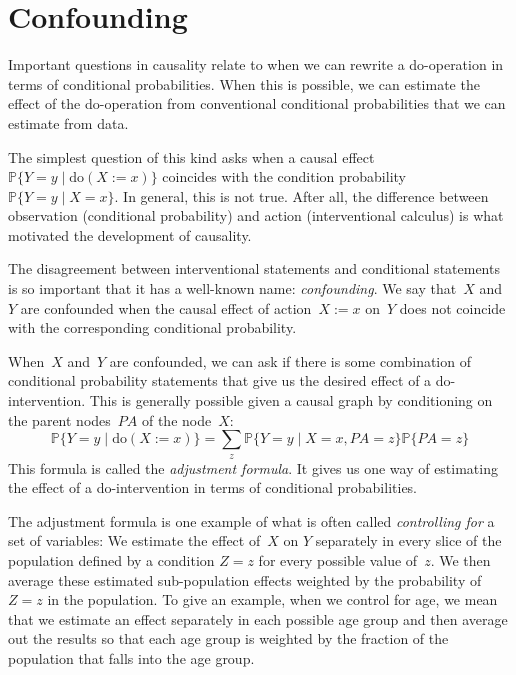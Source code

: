\documentclass{tufte-book}
\begin{document}
\hypertarget{confounding}{%
\section{Confounding}\label{confounding}}

Important questions in causality relate to when we can rewrite a
do-operation in terms of conditional probabilities. When this is
possible, we can estimate the effect of the do-operation from
conventional conditional probabilities that we can estimate from data.

The simplest question of this kind asks when a causal effect
\(\mathbb{P}\{Y=y\mid \mathrm{do}(X:=x)\}\) coincides with the condition
probability~\(\mathbb{P}\{Y=y\mid X=x\}.\) In general, this is not true.
After all, the difference between observation (conditional probability)
and action (interventional calculus) is what motivated the development
of causality.

The disagreement between interventional statements and conditional
statements is so important that it has a well-known name:
\emph{confounding}. We say that~\(X\) and~\(Y\) are
confounded when the causal effect of action~\(X:=x\) on~\(Y\) does not
coincide with the corresponding conditional probability.

When~\(X\) and~\(Y\) are confounded, we can ask if there is some
combination of conditional probability statements that give us the
desired effect of a do-intervention. This is generally possible given a
causal graph by conditioning on the parent nodes~\(\mathit{PA}\) of the
node~\(X\): \[
\mathbb{P}\{Y=y\mid \mathrm{do}(X:=x)\}
= \sum_z \mathbb{P}\{Y=y\mid X=x, \mathit{PA} = z\}
\mathbb{P}\{\mathit{PA} = z\}
\] This formula is called the \emph{adjustment
formula}. It gives us one way of estimating
the effect of a do-intervention in terms of conditional probabilities.

The adjustment formula is one example of what is often called
\emph{controlling for} a set of variables: We estimate the effect
of~\(X\) on \(Y\) separately in every slice of the population defined by
a condition \(Z=z\) for every possible value of~\(z\). We then average
these estimated sub-population effects weighted by the probability
of~\(Z=z\) in the population. To give an example, when we control for
age, we mean that we estimate an effect separately in each possible age
group and then average out the results so that each age group is
weighted by the fraction of the population that falls into the age
group.
\end{document}
